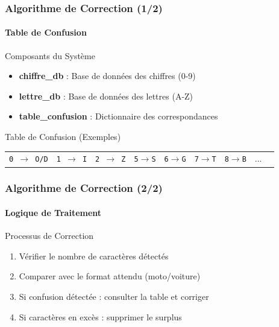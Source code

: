 \documentclass[
	11pt,
	aspectratio=169,
]{beamer}
\begin{document}

\begin{frame}
	\frametitle{Algorithme de Correction (1/2)}
	\framesubtitle{Table de Confusion}
	
	\begin{block}{Composants du Système}
		\begin{itemize}
			\item \textbf{chiffre\_db} : Base de données des chiffres (0-9)
			\item \textbf{lettre\_db} : Base de données des lettres (A-Z)
			\item \textbf{table\_confusion} : Dictionnaire des correspondances
		\end{itemize}
	\end{block}
	
	\smallskip
	
	\begin{exampleblock}{Table de Confusion (Exemples)}
		\small
		\begin{tabular}{ccccccccc}
			\texttt{0 $\rightarrow$ O/D} & \texttt{1 $\rightarrow$ I} & \texttt{2 $\rightarrow$ Z} & \texttt{5$\rightarrow$S} & \texttt{6$\rightarrow$G} & \texttt{7$\rightarrow$T} & \texttt{8$\rightarrow$B} & ...
		\end{tabular}
	\end{exampleblock}

\end{frame}


\begin{frame}
	\frametitle{Algorithme de Correction (2/2)}
	\framesubtitle{Logique de Traitement}
	
	\begin{block}{Processus de Correction}
		\begin{enumerate}
			\item Vérifier le nombre de caractères détectés
			\item Comparer avec le format attendu (moto/voiture)
			\item Si confusion détectée : consulter la table et corriger
			\item Si caractères en excès : supprimer le surplus
		\end{enumerate}
	\end{block}
\end{frame}


\end{document}
